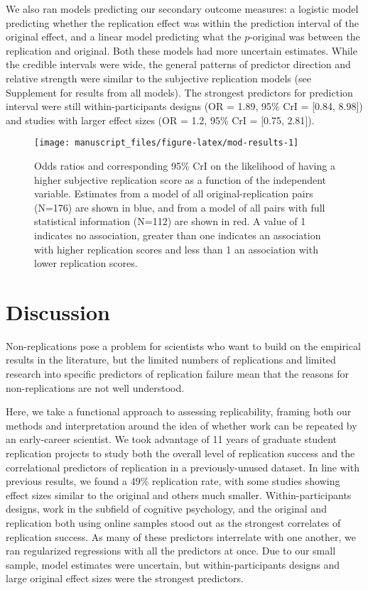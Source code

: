 \documentclass[
  english,
  a4paper,
]{article}
\begin{document}
We also ran models predicting our secondary outcome measures: a logistic model predicting whether the replication effect was within the prediction interval of the original effect, and a linear model predicting what the \(p\)-original was between the replication and original. Both these models had more uncertain estimates. While the credible intervals were wide, the general patterns of predictor direction and relative strength were similar to the subjective replication models (see Supplement for results from all models). The strongest predictors for prediction interval were still within-participants designs (OR = 1.89, 95\% CrI = {[}0.84, 8.98{]}) and studies with larger effect sizes (OR = 1.2, 95\% CrI = {[}0.75, 2.81{]}).

\begin{figure}[ht]
\texttt{[image: manuscript\_files/figure-latex/mod-results-1]} \caption{Odds ratios and corresponding 95\% CrI on the likelihood of having a higher subjective replication score as a function of the independent variable. Estimates from a model of all original-replication pairs (N=176) are shown in blue, and from a model of all pairs with full statistical information (N=112) are shown in red. A value of 1 indicates no association, greater than one indicates an association with higher replication scores and less than 1 an association with lower replication scores.}\label{fig:mod-results}
\end{figure}

\hypertarget{discussion}{%
\section{Discussion}\label{discussion}}

Non-replications pose a problem for scientists who want to build on the empirical results in the literature, but the limited numbers of replications and limited research into specific predictors of replication failure mean that the reasons for non-replications are not well understood.

Here, we take a functional approach to assessing replicability, framing both our methods and interpretation around the idea of whether work can be repeated by an early-career scientist. We took advantage of 11 years of graduate student replication projects to study both the overall level of replication success and the correlational predictors of replication in a previously-unused dataset. In line with previous results, we found a 49\% replication rate, with some studies showing effect sizes similar to the original and others much smaller. Within-participants designs, work in the subfield of cognitive psychology, and the original and replication both using online samples stood out as the strongest correlates of replication success. As many of these predictors interrelate with one another, we ran regularized regressions with all the predictors at once. Due to our small sample, model estimates were uncertain, but within-participants designs and large original effect sizes were the strongest predictors.
\end{document}
